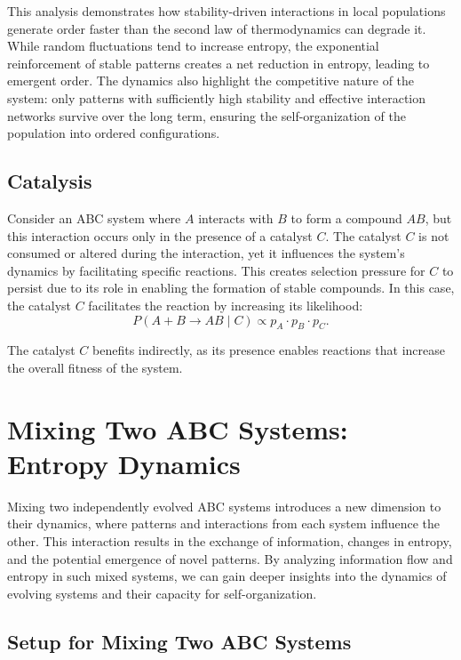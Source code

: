 \documentclass[entropy,article,submit,pdftex,moreauthors]{Definitions/mdpi}
\begin{document}
This analysis demonstrates how stability-driven interactions in local populations generate order faster than the second law of thermodynamics can degrade it. While random fluctuations tend to increase entropy, the exponential reinforcement of stable patterns creates a net reduction in entropy, leading to emergent order. The dynamics also highlight the competitive nature of the system: only patterns with sufficiently high stability and effective interaction networks survive over the long term, ensuring the self-organization of the population into ordered configurations.

\subsection{Catalysis}

Consider an ABC system where \( A \) interacts with \( B \) to form a compound \( AB \), but this interaction occurs only in the presence of a catalyst \( C \). The catalyst \( C \) is not consumed or altered during the interaction, yet it influences the system's dynamics by facilitating specific reactions. This creates selection pressure for \( C \) to persist due to its role in enabling the formation of stable compounds. In this case, the catalyst \( C \) facilitates the reaction by increasing its likelihood:
\[
P(A + B \to AB \mid C) \propto p_A \cdot p_B \cdot p_C.
\]

The catalyst \( C \) benefits indirectly, as its presence enables reactions that increase the overall fitness of the system.

\section{Mixing Two ABC Systems: Entropy Dynamics}

Mixing two independently evolved ABC systems introduces a new dimension to their dynamics, where patterns and interactions from each system influence the other. This interaction results in the exchange of information, changes in entropy, and the potential emergence of novel patterns. By analyzing information flow and entropy in such mixed systems, we can gain deeper insights into the dynamics of evolving systems and their capacity for self-organization.

\subsection{Setup for Mixing Two ABC Systems}
\end{document}
